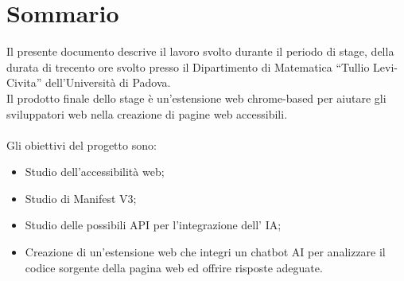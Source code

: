 \cleardoublepage
{}
{}
\begingroup
\let\clearpage\relax
\let\cleardoublepage\relax
\chapter*{Sommario}

\noindent Il presente documento descrive il lavoro svolto durante il periodo di stage, della durata di trecento ore svolto presso il Dipartimento di Matematica “Tullio Levi-Civita” dell’Università di Padova. \\
Il prodotto finale dello stage è un'estensione web chrome-based per aiutare gli sviluppatori web nella creazione di pagine web accessibili.\\
\\
Gli obiettivi del progetto sono:
\begin{itemize}
    \item Studio dell'accessibilità web;
    \item Studio di Manifest V3;
    \item Studio delle possibili API per l'integrazione dell' IA;
    \item Creazione di un'estensione web che integri un chatbot AI per analizzare il codice sorgente della pagina web ed offrire risposte adeguate.
\end{itemize}

\endgroup
\vfill